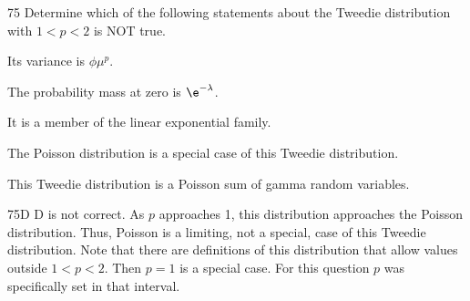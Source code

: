 \begin{question}{75}
Determine which of the following statements about the Tweedie distribution with $1 < p < 2$ is NOT true.

\begin{choices}
\item Its variance is $\phi \mu^p$.
\item The probability mass at zero is $\e^{-\lambda}$.
\item It is a member of the linear exponential family.
\item The Poisson distribution is a special case of this Tweedie distribution.
\item This Tweedie distribution is a Poisson sum of gamma random variables.
\end{choices}
\end{question}
\begin{solution}{75}{D}
D is not correct. As $p$ approaches 1, this distribution approaches the Poisson distribution. Thus, Poisson is a limiting, not a special, case of this Tweedie distribution. Note that there are definitions of this distribution that allow values outside $1 < p < 2$. Then $p = 1$ is a special case. For this question $p$ was specifically set in that interval.
\end{solution}
